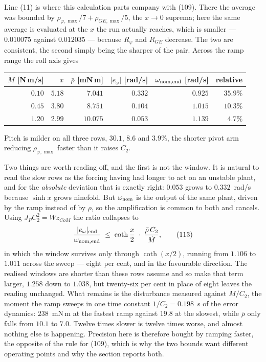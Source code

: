 \documentclass[10pt]{article}
\newcommand{\Wz}{W\!z_{CoM}}
\begin{document}
Line (11) is where this calculation parts company with (109). There the
average was bounded by $\rho_{\varphi,\max}/7 + \rho_{GE,\max}/5$, the
$x\to0$ suprema; here the same average is evaluated at the $x$ the run
actually reaches, which is smaller --- $0.010075$ against $0.012035$ ---
because $R_\varphi$ and $R_{GE}$ decrease. The two are consistent, the
second simply being the sharper of the pair. Across the ramp range the
roll axis gives

\begin{center}\small
\begin{tabular}{@{}rrrrrr@{}}
\toprule
$\dot M$ [N\,m/s] & $x$ & $\bar\rho$ [mN\,m] & $|e_\omega|$ [rad/s]
 & $\omega_{\rm nom,end}$ [rad/s] & relative \\
\midrule
$0.10$ & $5.18$ & $7.041$ & $0.332$ & $0.925$ & $35.9\%$ \\
$0.45$ & $3.80$ & $8.751$ & $0.104$ & $1.015$ & $10.3\%$ \\
$1.20$ & $2.99$ & $10.075$ & $0.053$ & $1.139$ & $\phantom{0}4.7\%$ \\
\bottomrule
\end{tabular}
\end{center}

Pitch is milder on all three rows, $30.1$, $8.6$ and $3.9\%$, the
shorter pivot arm reducing $\rho_{\varphi,\max}$ faster than it raises
$C_2$.

Two things are worth reading off, and the first is not the window. It is
natural to read the slow rows as the forcing having had longer to act on
an unstable plant, and for the \emph{absolute} deviation that is exactly
right: $0.053$ grows to $0.332$~rad/s because $\sinh x$ grows ninefold.
But $\omega_{\rm nom}$ is the output of the same plant, driven by the
ramp instead of by $\rho$, so the amplification is common to both and
cancels. Using $J_PC_2^{2} = \Wz$ the ratio collapses to
\begin{equation}
  \frac{|e_\omega|_{\rm end}}{\omega_{\rm nom,end}}
  \;\le\; \coth\frac{x}{2}\;\cdot\;\frac{\bar\rho\,C_2}{\dot M} ,
  \tag{113}
\end{equation}
in which the window survives only through $\coth(x/2)$, running from
$1.106$ to $1.011$ across the sweep --- eight per cent, and in the
favourable direction. The realised windows are shorter than these rows
assume and so make that term larger, $1.258$ down to $1.038$, but
twenty-six per cent in place of eight leaves the reading unchanged. What
remains is the disturbance measured against
$\dot M/C_2$, the moment the ramp sweeps in one time constant
$1/C_2 = 0.198$~s of the error dynamics: $238$~mN\,m at the fastest ramp
against $19.8$ at the slowest, while $\bar\rho$ only falls from $10.1$
to $7.0$. Twelve times slower is twelve times worse, and almost nothing
else is happening. Precision here is therefore bought by ramping faster,
the opposite of the rule for (109), which is why the two bounds want
different operating points and why the section reports both.
\end{document}
